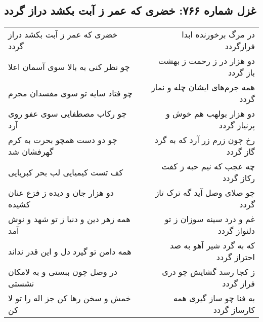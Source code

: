 \begin{center}
\section*{غزل شماره ۷۶۶: خضری که عمر ز آبت بکشد دراز گردد}
\label{sec:0766}
\begin{longtable}{l p{0.5cm} r}
خضری که عمر ز آبت بکشد دراز گردد
&&
در مرگ برخورنده ابدا فرازگردد
\\
چو نظر کنی به بالا سوی آسمان اعلا
&&
دو هزار در ز رحمت ز بهشت باز گردد
\\
چو فتاد سایه تو سوی مفسدان مجرم
&&
همه جرم‌های ایشان چله و نماز گردد
\\
چو رکاب مصطفایی سوی عفو روی آرد
&&
دو هزار بولهب هم خوش و پرنیاز گردد
\\
چو دو دست همچو بحرت به کرم گهرفشان شد
&&
رخ چون زرم زر آرد که به گرد گاز گردد
\\
کف تست کیمیایی لب بحر کبریایی
&&
چه عجب که نیم حبه ز کفت رکاز گردد
\\
دو هزار جان و دیده ز فزع عنان کشیده
&&
چو صلای وصل آید گه ترک تاز گردد
\\
همه زهر دین و دنیا ز تو شهد و نوش آمد
&&
غم و درد سینه سوزان ز تو دلنواز گردد
\\
همه دامن تو گیرد دل و این قدر نداند
&&
که به گرد شیر آهو به صد احتراز گردد
\\
در وصل چون ببستی و به لامکان نشستی
&&
ز کجا رسد گشایش چو دری فراز گردد
\\
خمش و سخن رها کن جز اله را تو لا کن
&&
به فنا چو ساز گیری همه کارساز گردد
\\
\end{longtable}
\end{center}
